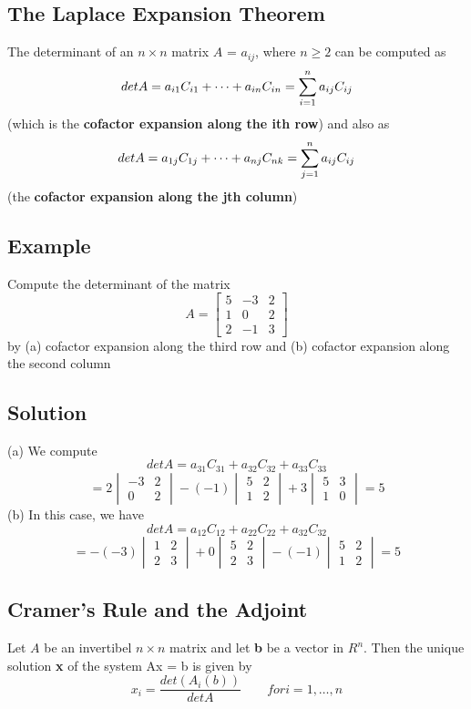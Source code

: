 \subsection*{The Laplace Expansion Theorem}
The determinant of an $n\times n$ matrix $A$ = $a_{ij}$, where $n\geq 2$ can be computed as
$$det A = a_{i1}C_{i1}+\dots+a_{in}C_{in} \\= \sum^n_{i=1}a_{ij}C_{ij}$$
(which is the \textbf{cofactor expansion along the ith row}) and also as
$$det A = a_{1j}C_{1j}+\dots+a_{nj}C_{nk} \\= \sum^n_{j=1}a_{ij}C_{ij}$$
(the \textbf{cofactor expansion along the jth column})
\subsection*{Example}
Compute the determinant of the matrix
$$A = \begin{bmatrix}
    5&-3&2\\1&0&2\\2&-1&3
\end{bmatrix}$$ by (a) cofactor expansion along the third row and (b) cofactor expansion along the second column
\subsection*{Solution}
(a) We compute $$det A = a_{31}C_{31} + a_{32}C_{32} + a_{33}C_{33}$$
$$= 2\begin{vmatrix}
    -3&2\\0&2
\end{vmatrix} - (-1)\begin{vmatrix}
    5&2\\1&2
\end{vmatrix} + 3\begin{vmatrix}
    5&3\\1&0
\end{vmatrix} = 5$$
(b) In this case, we have 
$$det A = a_{12}C_{12} + a_{22}C_{22} + a_{32}C_{32}$$
$$= -(-3)\begin{vmatrix}
    1&2\\2&3
\end{vmatrix} + 0\begin{vmatrix}
    5&2\\2&3
\end{vmatrix} - (-1)\begin{vmatrix}
    5&2\\1&2
\end{vmatrix} = 5$$

\subsection*{Cramer's Rule and the Adjoint}
Let $A$ be an invertibel $n\times n $ matrix and let \textbf{b} be a vector in $R^n$. Then the unique solution \textbf{x} of the system Ax = b is given by
$$x_i = \frac{det(A_i(b))}{det A}\qquad for i = 1, \dots, n$$
